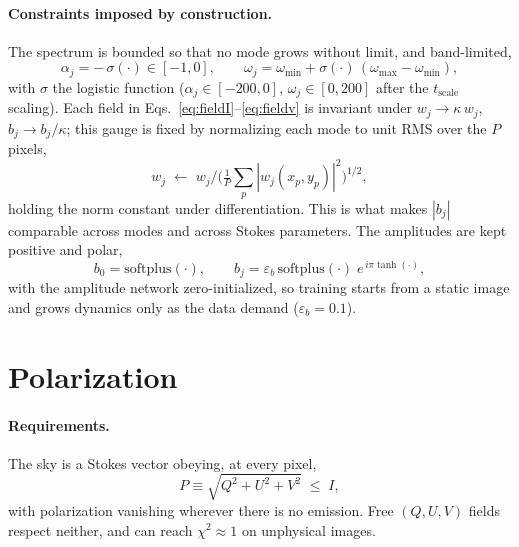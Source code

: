 \documentclass[11pt]{article}
\newcommand{\tsc}{t_{\mathrm{scale}}}
\begin{document}
\paragraph{Constraints imposed by construction.}
The spectrum is bounded so that no mode grows without limit, and band-limited,
\begin{equation}
  \alpha_j = -\,\sigma(\cdot)\in[-1,0], \qquad
  \omega_j = \omega_{\min}+\sigma(\cdot)\,(\omega_{\max}-\omega_{\min}),
  \label{eq:spectrum}
\end{equation}
with $\sigma$ the logistic function ($\alpha_j\in[-200,0]$, $\omega_j\in[0,200]$
after the $\tsc$ scaling). Each field in Eqs.~\eqref{eq:fieldI}--\eqref{eq:fieldv} is invariant under
$w_j\to\kappa\,w_j$, $b_j\to b_j/\kappa$; this gauge is fixed by normalizing each mode to
unit RMS over the $P$ pixels,
\begin{equation}
  w_j \;\longleftarrow\; w_j \Big/ \Big(\tfrac{1}{P}\textstyle\sum_{p}|w_j(x_p,y_p)|^2\Big)^{1/2},
  \label{eq:gauge}
\end{equation}
holding the norm constant under differentiation. This is what makes $|b_j|$
comparable across modes and across Stokes parameters. The amplitudes are kept
positive and polar,
\begin{equation}
  b_0=\mathrm{softplus}(\cdot),\qquad
  b_j=\varepsilon_b\,\mathrm{softplus}(\cdot)\;e^{\,i\pi\tanh(\cdot)},
  \label{eq:amplitudes}
\end{equation}
with the amplitude network zero-initialized, so training starts from a static image
and grows dynamics only as the data demand ($\varepsilon_b=0.1$).

\section{Polarization}

\paragraph{Requirements.}
The sky is a Stokes vector obeying, at every pixel,
\begin{equation}
  P \equiv \sqrt{Q^2+U^2+V^2}\;\le\;I,
  \label{eq:pli}
\end{equation}
with polarization vanishing wherever there is no emission. Free $(Q,U,V)$ fields
respect neither, and can reach $\chi^2\approx1$ on unphysical images.
\end{document}
